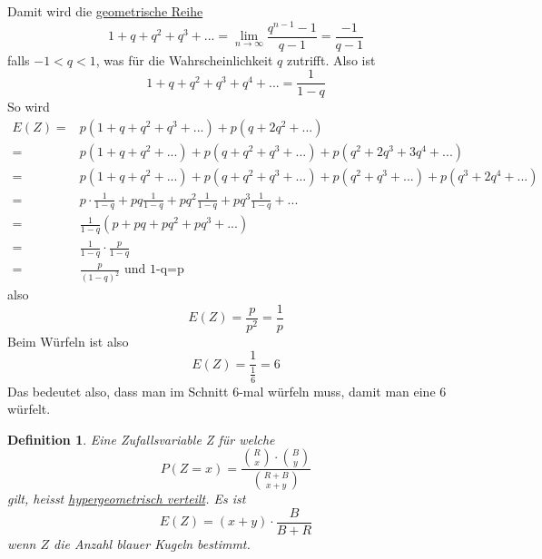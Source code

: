 \documentclass{report}
\newtheorem{mydef}{Definition}
\begin{document}
Damit wird die \underline{geometrische Reihe}
\begin{equation}
1 + q + q^2 + q^3 + ... = \lim_{n \to \infty}{\frac{q^{n-1}-1}{q-1}} = \frac{-1}{q-1}
\end{equation}
falls $-1 < q < 1$, was für die Wahrscheinlichkeit $q$ zutrifft. Also ist
\begin{equation}
1 + q + q^2 + q^3 + q^4 + ... = \frac{1}{1-q}
\end{equation}
So wird
\begin{align*}
E(Z) = & p (1 + q + q^2 + q^3 + ...) + p ( q + 2q^2 + ...)\\
= & p(1 + q + q^2 + ...) + p(q + q^2 + q^3 + ...) + p (q^2 + 2q^3 + 3q^4 + ...)\\
= & p(1 + q + q^2 + ...) + p(q + q^2 + q^3 + ...) + p (q^2 + q^3 + ...) + p ( q^3 + 2 q^4 + ...)\\
= & p \cdot \frac{1}{1-q} + pq\frac{1}{1-q} + pq^2\frac{1}{1-q} + pq^3\frac{1}{1-q} + ...\\
= & \frac{1}{1-q} ( p + pq + pq^2 + pq^3 + ...)\\
= & \frac{1}{1-q} \cdot \frac{p}{1-q}\\
= & \frac{p}{(1-q)^2} \mbox{ und 1-q=p}
\end{align*}
also
\begin{equation}
E(Z) = \frac{p}{p^2} = \frac{1}{p}
\end{equation}
Beim Würfeln ist also
\begin{equation}
E(Z) = \frac{1}{\frac{1}{6}} = 6
\end{equation}
Das bedeutet also, dass man im Schnitt 6-mal würfeln muss, damit man eine 6 würfelt.
\begin{mydef}
Eine Zufallsvariable Z für welche
\begin{equation}
P(Z=x) = \frac{\binom{R}{x} \cdot \binom{B}{y}}{\binom{R+B}{x+y}}
\end{equation}
gilt, heisst \underline{hypergeometrisch verteilt}. Es ist
\begin{equation}
E(Z) = (x+y) \cdot \frac{B}{B+R}
\end{equation}
wenn $Z$ die Anzahl blauer Kugeln bestimmt.
\end{mydef}
\end{document}
